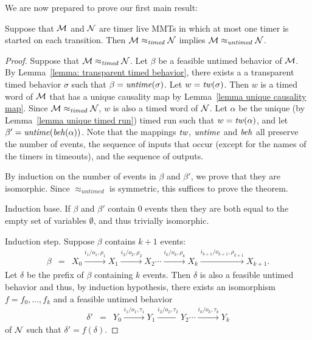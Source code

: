 \fi
We are now prepared to prove our first main result:

\begin{theorem}
\label{timedimpliesuntimed}
Suppose that ${\cal M}$ and ${\cal N}$ are timer live MMTs in which at most one timer is started on each transition. Then
${\cal M} \approx_{\mathit{timed}} {\cal N}$
implies
${\cal M} \approx_{\mathit{untimed}} {\cal N}$.
\end{theorem}
\iflong
\begin{proof}
Suppose that ${\cal M} \approx_{\mathit{timed}} {\cal N}$.
Let $\beta$ be a feasible untimed behavior of ${\cal M}$.
By Lemma~\ref{lemma: transparent timed behavior}, there exists a 
a transparent timed behavior $\sigma$ such that $\beta = \mathit{untime}(\sigma)$.
Let  $w = \mathit{tw}(\sigma)$.
Then $w$ is a timed word of ${\cal M}$ that has a unique causality map by Lemma~\ref{lemma unique causality map}.
Since ${\cal M} \approx_{\mathit{timed}} {\cal N}$, $w$ is also a timed word of ${\cal N}$.
Let $\alpha$ be the unique (by Lemma~\ref{lemma unique timed run}) timed run such that $w = \mathit{tw}(\alpha)$,
and let $\beta' = \mathit{untime}(\mathit{beh}(\alpha))$.
Note that the mappings $\mathit{tw}$, $\mathit{untime}$ and $\mathit{beh}$ all preserve the number of events, the sequence of inputs that occur (except for the names of the timers in timeouts), and the sequence of outputs.

By induction on the number of events in $\beta$ and $\beta'$, we prove that they are isomorphic.
Since $\approx_{\mathit{untimed}}$ is symmetric, this suffices to prove the theorem.

Induction base. If $\beta$ and $\beta'$ contain $0$ events then they are both equal to the empty set of variables $\emptyset$,
and thus trivially isomorphic.

Induction step. Suppose $\beta$ contains $k+1$ events:
\begin{eqnarray*}
\beta & = & X_0 \xrightarrow{i_1/o_1, \rho_1} X_1  \xrightarrow{i_2/o_2, \rho_2} X_2 \cdots \xrightarrow{i_k/o_k, \rho_k} X_{k}
 \xrightarrow{i_{k+1}/o_{k+1}, \rho_{k+1}} X_{k+1}.
\end{eqnarray*}
Let $\delta$ be the prefix of $\beta$ containing $k$ events. Then $\delta$ is also a feasible untimed behavior and thus, by
induction hypothesis, there exists an isomorphism $f = f_0 ,\ldots, f_k$ and a feasible untimed behavior
\begin{eqnarray*}
\delta' & = & Y_0 \xrightarrow{i_1/o_1, \tau_1} Y_1  \xrightarrow{i_2/o_2, \tau_2} Y_2 \cdots \xrightarrow{i_k/o_k, \tau_k} Y_{k}
\end{eqnarray*}
of ${\cal N}$ such that $\delta' = f(\delta)$.
\end{proof}
\fi

